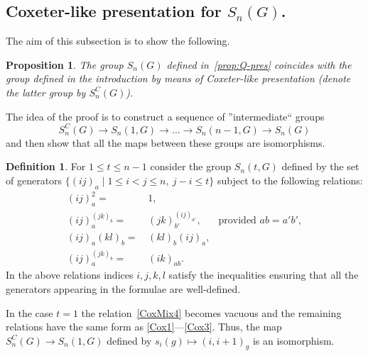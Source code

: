 \documentclass[oneside, 10pt]{amsart}
\theoremstyle{plain}
\numberwithin{equation}{section}
\numberwithin{lemma}{section}
\newtheorem{prop}[lemma]{Proposition}
\theoremstyle{remark}
\theoremstyle{definition}
\newtheorem{df}[lemma]{Definition} \Crefname{df}{Definition}{Definitions}
\begin{document}
\subsection{Coxeter-like presentation for $S_n(G)$.}
The aim of this subsection is to show the following.
\begin{prop}\label{prop:Cox-Amalgam}
The group $S_n(G)$ defined in~\cref{prop:Q-pres} coincides with the group defined in the introduction by means of Coxeter-like presentation
(denote the latter group by $S_n^{C}(G)$).
\end{prop}

The idea of the proof is to construct a sequence of ''intermediate`` groups
\[S_n^C(G) \to S_n(1, G) \to \ldots \to S_n(n-1,G) \to S_n(G)\]
and then show that all the maps between these groups are isomorphisms.

\begin{df}
For $1\leq t\leq n-1$ consider the group $S_n(t, G)$ defined by the set of generators 
$\{(ij)_a \mid 1\leq i<j \leq n,\ j-i\leq t\}$ subject to the following relations:
\begin{align}
(ij)_a^2                      = &\, 1,                   &               \label{CoxMix1} \\
(ij)_a^{(jk)_b}               = &\, (jk)_{b'}^{(ij)_{a'}}, & \text{provided } ab = a'b',      \label{CoxMix2} \\
(ij)_a (kl)_b                 = &\, (kl)_b (ij)_a,       &               \label{CoxMix3} \\
(ij)_a ^ {(jk)_b}             = &\, (ik)_{ab}.           &               \label{CoxMix4}
\end{align}
In the above relations indices $i,j,k,l$ satisfy the inequalities ensuring that all the generators appearing in the formulae are well-defined.
\end{df}

In the case $t=1$ the relation~\eqref{CoxMix4} becomes vacuous and the remaining relations have the same form as \eqref{Cox1}---\eqref{Cox3}.
Thus, the map $S_n^C(G) \to S_n(1, G)$ defined by $s_i(g)\mapsto (i,i+1)_g$ is an isomorphism. 
\end{document}
